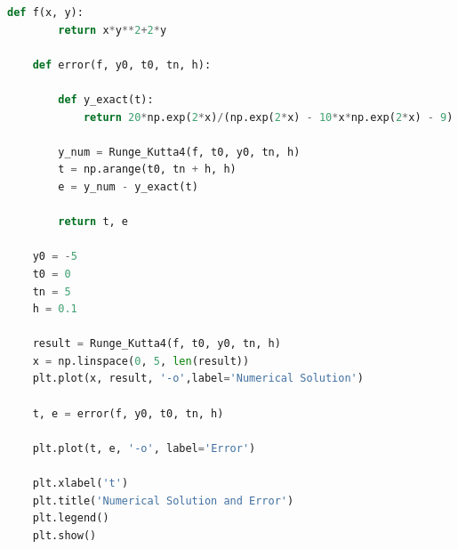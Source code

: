 \documentclass[12pt, a4paper, oneside]{ctexart}
\begin{document}
\begin{spacing}{2.0}
\begin{lstlisting}[language=Python, caption=4th-order Runge-Kutta]
    def f(x, y):
        return x*y**2+2*y
    
    def error(f, y0, t0, tn, h):
    
        def y_exact(t):
            return 20*np.exp(2*x)/(np.exp(2*x) - 10*x*np.exp(2*x) - 9)
    
        y_num = Runge_Kutta4(f, t0, y0, tn, h)
        t = np.arange(t0, tn + h, h)
        e = y_num - y_exact(t)
    
        return t, e
    
    y0 = -5
    t0 = 0
    tn = 5
    h = 0.1
    
    result = Runge_Kutta4(f, t0, y0, tn, h)
    x = np.linspace(0, 5, len(result))
    plt.plot(x, result, '-o',label='Numerical Solution')
    
    t, e = error(f, y0, t0, tn, h)
    
    plt.plot(t, e, '-o', label='Error')
    
    plt.xlabel('t')
    plt.title('Numerical Solution and Error')
    plt.legend()
    plt.show()
    
\end{lstlisting}

\end{spacing}
\end{document}
